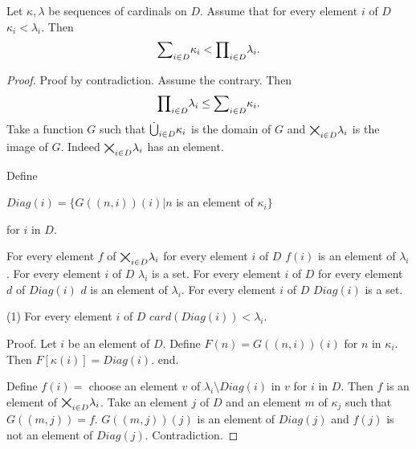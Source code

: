 \documentclass{article}
\newcommand{\val}[2]{#1_{#2}}
\begin{document}
\begin{forthel}
    \begin{theorem}
      Let $\kappa, \lambda$ be sequences of cardinals on $D$. 
     Assume that for every element $i$ of $D$ 
     $\val{\kappa}{i} < \val{\lambda}{i}$. 
     Then $$\Sum{\kappa}{D} < \Prod{\lambda}{D}.$$
    \end{theorem}
    \begin{proof}
      Proof by contradiction. Assume the contrary. 
      Then $$\Prod{\lambda}{D} \leq \Sum{\kappa}{D}.$$
      Take a function $G$ such that $\SumSet{\kappa}{D}$ is the domain of $G$ 
      and $\ProdSet{\lambda}{D}$ is the image of $G$.
      Indeed $\ProdSet{\lambda}{D}$ has an element.
      
      Define

      $Diag(i) = 
     \{G((n,i))(i) | n$ is an element of $\val{\kappa}{i}\}$
 
      for $i$ in $D$.

      For every element $f$ of $\ProdSet{\lambda}{D}$ 
      for every element $i$ of $D$ 
      $f(i)$ is an element of $\val{\lambda}{i}$.
      For every element $i$ of $D$ $\val{\lambda}{i}$ is a set.
      For every element $i$ of $D$ for every element $d$ of $Diag(i)$ 
      $d$ is an element of $\val{\lambda}{i}$.
      For every element $i$ of $D$ $Diag(i)$ is a set.
      
     (1) For every element $i$ of $D$ 
      $card(Diag(i)) < \val{\lambda}{i}$.
      
      Proof.
        Let $i$ be an element of $D$. 
        Define $F(n) = G((n,i))(i)$ for $n$ in $\val{\kappa}{i}$. 
        Then $F[\kappa(i)] = Diag(i)$.
      end.

      Define 
      $f(i) =$ choose an element $v$ of 
      $\val{\lambda}{i} \setminus Diag(i)$ in 
      $v$ for $i$ in $D$. Then $f$ is an element of 
      $\ProdSet{\lambda}{D}$. Take an element $j$ of $D$ and an 
      element $m$ of $\val{\kappa}{j}$ such that $G((m,j)) = f$. 
      $G((m,j))(j)$ is an element of $Diag(j)$ and $f(j)$ 
      is not an element of $Diag(j)$. Contradiction.
    \end{proof}
  \end{forthel}
\end{document}
